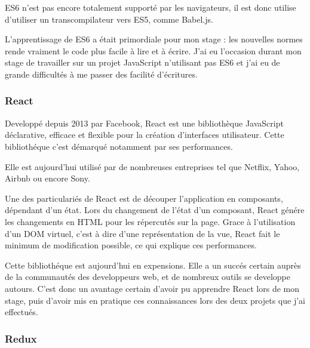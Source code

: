 \documentclass[12pt,a4paper]{article}
\begin{document}
  \bigskip

  ES6 n'est pas encore totalement supporté par les navigateurs, il est
  donc utilise d'utiliser un transcompilateur vers ES5, comme Babel.js.

  \bigskip

  L'apprentissage de ES6 a était primordiale pour mon stage : les
  nouvelles normes rende vraiment le code plus facile à lire et à écrire.
  J'ai eu l'occasion durant mon stage de travailler sur un projet
  JavaScript n'utilisant pas ES6 et j'ai eu de grande difficultés à me
  passer des facilité d'écritures.

  \bigskip

  \subsubsection{React}\label{react}

  \bigskip

  Developpé depuis 2013 par Facebook, React est une bibliothèque
  JavaScript déclarative, efficace et flexible pour la création
  d'interfaces utilisateur. Cette bibliothéque c'est démarqué notamment
  par ses performances.

  \bigskip

  Elle est aujourd'hui utilisé par de nombreuses entreprises tel que
  Netflix, Yahoo, Airbnb ou encore Sony.

  \bigskip

  Une des particulariés de React est de découper l'application en
  composants, dépendant d'un état. Lors du changement de l'état d'un
  composant, React génére les changements en HTML pour les répercutés sur
  la page. Grace à l'utilisation d'un DOM virtuel, c'est à dire d'une
  représentation de la vue, React fait le minimum de modification
  possible, ce qui explique ces performances.

  \bigskip

  Cette bibliothéque est aujourd'hui en expensions. Elle a un succés
  certain auprès de la communautés des developpeurs web, et de nombreux
  outils se developpe autours. C'est donc un avantage certain d'avoir pu
  apprendre React lors de mon stage, puis d'avoir mis en pratique ces
  connaissances lors des deux projets que j'ai effectués.

  \bigskip

  \subsubsection{Redux}\label{redux}
\end{document}

